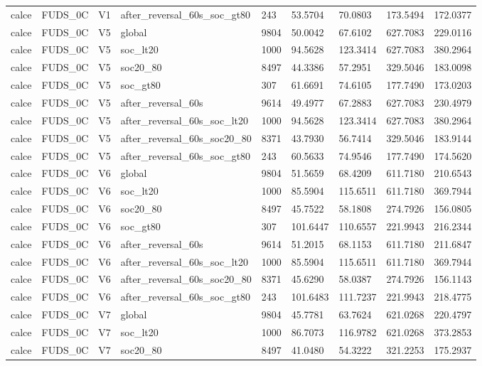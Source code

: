 \begin{tabular}{lllllllll}
calce & FUDS\_0C & V1 & after\_reversal\_60s\_soc\_gt80 & 243 & 53.5704 & 70.0803 & 173.5494 & 172.0377 \\
calce & FUDS\_0C & V5 & global & 9804 & 50.0042 & 67.6102 & 627.7083 & 229.0116 \\
calce & FUDS\_0C & V5 & soc\_lt20 & 1000 & 94.5628 & 123.3414 & 627.7083 & 380.2964 \\
calce & FUDS\_0C & V5 & soc20\_80 & 8497 & 44.3386 & 57.2951 & 329.5046 & 183.0098 \\
calce & FUDS\_0C & V5 & soc\_gt80 & 307 & 61.6691 & 74.6105 & 177.7490 & 173.0203 \\
calce & FUDS\_0C & V5 & after\_reversal\_60s & 9614 & 49.4977 & 67.2883 & 627.7083 & 230.4979 \\
calce & FUDS\_0C & V5 & after\_reversal\_60s\_soc\_lt20 & 1000 & 94.5628 & 123.3414 & 627.7083 & 380.2964 \\
calce & FUDS\_0C & V5 & after\_reversal\_60s\_soc20\_80 & 8371 & 43.7930 & 56.7414 & 329.5046 & 183.9144 \\
calce & FUDS\_0C & V5 & after\_reversal\_60s\_soc\_gt80 & 243 & 60.5633 & 74.9546 & 177.7490 & 174.5620 \\
calce & FUDS\_0C & V6 & global & 9804 & 51.5659 & 68.4209 & 611.7180 & 210.6543 \\
calce & FUDS\_0C & V6 & soc\_lt20 & 1000 & 85.5904 & 115.6511 & 611.7180 & 369.7944 \\
calce & FUDS\_0C & V6 & soc20\_80 & 8497 & 45.7522 & 58.1808 & 274.7926 & 156.0805 \\
calce & FUDS\_0C & V6 & soc\_gt80 & 307 & 101.6447 & 110.6557 & 221.9943 & 216.2344 \\
calce & FUDS\_0C & V6 & after\_reversal\_60s & 9614 & 51.2015 & 68.1153 & 611.7180 & 211.6847 \\
calce & FUDS\_0C & V6 & after\_reversal\_60s\_soc\_lt20 & 1000 & 85.5904 & 115.6511 & 611.7180 & 369.7944 \\
calce & FUDS\_0C & V6 & after\_reversal\_60s\_soc20\_80 & 8371 & 45.6290 & 58.0387 & 274.7926 & 156.1143 \\
calce & FUDS\_0C & V6 & after\_reversal\_60s\_soc\_gt80 & 243 & 101.6483 & 111.7237 & 221.9943 & 218.4775 \\
calce & FUDS\_0C & V7 & global & 9804 & 45.7781 & 63.7624 & 621.0268 & 220.4797 \\
calce & FUDS\_0C & V7 & soc\_lt20 & 1000 & 86.7073 & 116.9782 & 621.0268 & 373.2853 \\
calce & FUDS\_0C & V7 & soc20\_80 & 8497 & 41.0480 & 54.3222 & 321.2253 & 175.2937 \\

\end{tabular}
